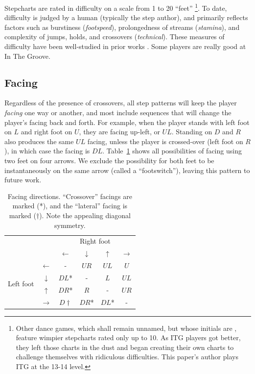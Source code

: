 \documentclass[10pt]{sigplanconf}
\begin{document}
Stepcharts are rated in difficulty on a scale from 1 to 20 ``feet'' \cite{simplylove}\footnote{
Other dance games, which shall remain unnamed, but whose initials are \cite{konami}, feature wimpier stepcharts rated only up to 10. As ITG players got better, they left those charts in the dust and began creating their own charts to challenge themselves with ridiculous difficulties. This paper's author plays ITG at the 13-14 level.}.
To date, difficulty is judged by a human (typically the step author), and primarily reflects factors such as burstiness ({\em footspeed}), prolongedness of streams ({\em stamina}), and complexity of jumps, holds, and crossovers ({\em technical}).
These measures of difficulty have been well-studied in prior works \cite{teamdragonforce,callofthehound,dawgsinthehouse}.
Some players are really good at In The Groove.

\subsection{Facing}

Regardless of the presence of crossovers, all step patterns will keep the player {\em facing} one way or another, and most include sequences that will change the player's facing back and forth.
For example, when the player stands with left foot on $L$ and right foot on $U$, they are facing up-left, or $UL$. Standing on $D$ and $R$ also produces the same $UL$ facing, unless the player is crossed-over (left foot on $R$), in which case the facing is $DL$.
Table~\ref{tab:facing} shows all possibilities of facing using two feet on four arrows.
We exclude the possibility for both feet to be instantaneously on the same arrow (called a ``footswitch''), leaving this pattern to future work.

\begin{table}[h]
	\begin{center}
	\begin{tabular}{cc|cccc}
		& & \multicolumn{4}{c}{Right foot} \\
		& & $\leftarrow$ & $\downarrow$ & $\uparrow$ & $\rightarrow$ \\
		\hline
		\multirow{4}{*}{Left foot}
		& $\leftarrow$  & - & $UR$ & $UL$ & $U$ \\
		& $\downarrow$  & $DL$* & - & $L$ & $UL$ \\
		& $\uparrow$    & $DR$* & $R$ & - & $UR$ \\
		& $\rightarrow$ & $D\dagger$ & $DR$* & $DL$* & - \\

	\end{tabular}
	\end{center}
	\caption{Facing directions. ``Crossover'' facings are marked (*), and the ``lateral'' facing is marked ($\dagger$). Note the appealing diagonal symmetry.}
	\label{tab:facing}
\end{table}
\end{document}

